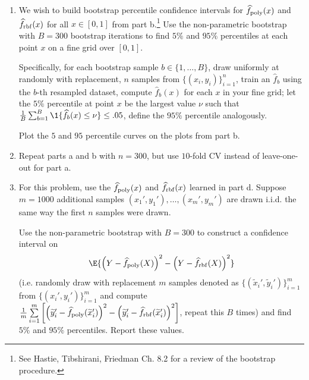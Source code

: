 \documentclass{article}
\begin{document}
\begin{aprob}
\begin{enumerate}
        \item {} We wish to build bootstrap percentile confidence intervals for $\widehat{f}_{\rm poly}(x)$ and $\widehat{f}_{\rm rbf}(x)$ for all $x \in [0,1]$ from part b.\footnote{See Hastie, Tibshirani, Friedman Ch. 8.2 for a review of the bootstrap procedure.}
        Use the non-parametric bootstrap with $B=300$ bootstrap iterations to find $5\%$ and $95\%$ percentiles at each point $x$ on a fine grid over $[0,1]$.
      
        \medskip
      
        Specifically, for each bootstrap sample $b \in \{1,\dots,B\}$, draw uniformly at randomly with replacement, $n$ samples from $\{(x_i,y_i)\}_{i=1}^n$, train an $\widehat{f}_b$ using the $b$-th resampled dataset, compute $\widehat{f}_b(x)$ for each $x$ in your fine grid; let the $5\%$ percentile at point $x$ be the largest value $\nu$ such that $\frac{1}{B} \sum_{b=1}^B \1\{ \widehat{f}_b(x) \leq \nu \} \leq .05$, define the $95\%$ percentile analogously. 
      
        \medskip
      
        Plot the $5$ and $95$ percentile curves on the plots from part b.
        \fi
      
        \item {} Repeat parts a and b with $n=300$, but use $10$-fold CV instead of leave-one-out for part a.
        \iffalse {}
        \item {} For this problem, use the $\widehat{f}_{\rm poly}(x)$ and $\widehat{f}_{\rm rbf}(x)$ learned in part d. Suppose $m=1000$ additional samples $(x_1',y_1'),\dots,(x_m',y_m')$ are drawn i.i.d. the same way the first $n$ samples were drawn. 
      
        \medskip
        
        Use the non-parametric bootstrap with $B=300$ to construct a confidence interval on
        $$
        \E{\left(Y-\widehat{f}_{\rm poly}(X)\right)^2 - \left(Y-\widehat{f}_{\rm rbf}(X)\right)^2}
        $$
        (i.e. randomly draw with replacement $m$ samples denoted as $\{(\widetilde{x}_i',\widetilde{y}_i')\}_{i=1}^m$ from $\{(x_i',y_i')\}_{i=1}^m$ and compute $\frac{1}{m} \sum\limits_{i=1}^m \left[ \left(\widetilde{y}_i'-\widehat{f}_{\rm poly}(\widetilde{x}_i')\right)^2 - \left(\widetilde{y}_i'-\widehat{f}_{\rm rbf}(\widetilde{x}_i')\right)^2 \right]$, repeat this $B$ times) and find $5\%$ and $95\%$ percentiles. Report these values.
        

\end{enumerate}
\end{aprob}
\end{document}
